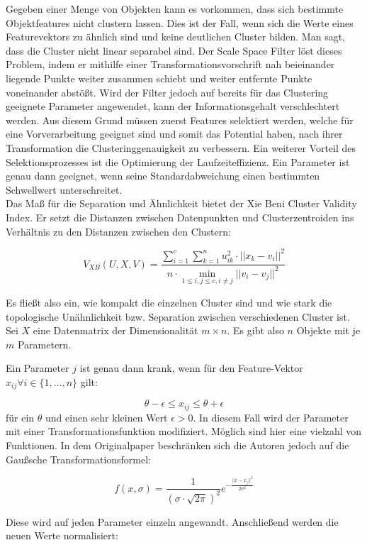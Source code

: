 \documentclass[11pt,ceqn]{book}
\begin{document}
Gegeben einer Menge von Objekten kann es vorkommen, dass sich bestimmte Objektfeatures nicht clustern lassen. Dies ist der Fall, wenn sich die Werte eines Featurevektors zu ähnlich sind und keine deutlichen Cluster bilden. Man sagt, dass die Cluster nicht linear separabel sind. Der Scale Space Filter löst dieses Problem, indem er mithilfe einer Transformationsvorschrift nah beieinander liegende Punkte weiter zusammen schiebt und weiter entfernte Punkte voneinander abstößt. Wird der Filter jedoch auf bereits für das Clustering geeignete Parameter angewendet, kann der Informationsgehalt verschlechtert werden. Aus diesem Grund müssen zuerst Features selektiert werden, welche für eine Vorverarbeitung geeignet sind und somit das Potential haben, nach ihrer Transformation die Clusteringgenauigkeit zu verbessern. Ein weiterer Vorteil des Selektionsprozesses ist die Optimierung der Laufzeiteffizienz. Ein Parameter ist genau dann geeignet, wenn seine Standardabweichung einen bestimmten Schwellwert unterschreitet.
\\
Das Maß für die Separation und Ähnlichkeit bietet der Xie Beni Cluster Validity Index. Er setzt die Distanzen zwischen Datenpunkten und Clusterzentroiden ins Verhältnis zu den Distanzen zwischen den Clustern:

$$V_{XB}(U,X,V)= \frac{\sum\limits_{i=1}^c \sum\limits_{k=1}^n u_{ik}^2 \cdot ||x_k-v_i||^2}{n \cdot \min\limits_{1\leqslant i,j \leqslant c, i \neq j}||v_i-v_j||^2}$$

Es fließt also ein, wie kompakt die einzelnen Cluster sind und wie stark die topologische Unähnlichkeit bzw. Separation zwischen verschiedenen Cluster ist.
\\
Sei $X$ eine Datenmatrix der Dimensionalität $m\times n$. Es gibt also $n$ Objekte mit je $m$ Parametern. 

Ein Parameter $j$ ist genau dann krank, wenn für den Feature-Vektor $x_{ij} \forall i\in \{1,\dots, n\}$ gilt:

$$\theta-\epsilon\leqslant x_{ij} \leqslant\theta+\epsilon$$ 
für ein $\theta$ und einen sehr kleinen Wert $\epsilon>0$. In diesem Fall wird der Parameter mit einer Transformationsfunktion modifiziert. Möglich sind hier eine vielzahl von Funktionen. In dem Originalpaper beschränken sich die Autoren jedoch auf die Gaußsche Transformationsformel:

$$f(x,\sigma) = \frac{1}{(\sigma \cdot \sqrt{2\pi})^2}e^{-\frac{||x-x_j||^2}{2\sigma^2}}$$

Diese wird auf jeden Parameter einzeln angewandt. Anschließend werden die neuen Werte normalisiert:
\end{document}
